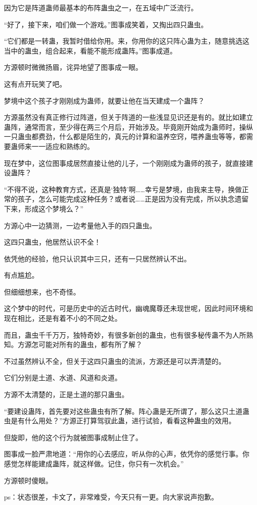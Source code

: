 \begin{this_body}
因为它是阵道蛊师最基本的布阵蛊虫之一，在五域中广泛流行。

“好了，接下来，咱们做一个游戏。”图事成笑着，又掏出四只蛊虫。

“它们都是一转蛊，我暂时借给你用。来，你用你的这只阵心蛊为主，随意挑选这当中的蛊虫，组合起来，看能不能形成蛊阵。”图事成道。

方源顿时微微扬眉，诧异地望了图事成一眼。

这有点开玩笑了吧。

梦境中这个孩子才刚刚成为蛊师，就要让他在当天建成一个蛊阵？

方源虽然没有真正修行过阵道，但关于阵道的一些浅显见识还是有的。就比如建立蛊阵，通常而言，至少得在两三个月后，开始涉及。毕竟刚开始成为蛊师时，操纵一只蛊虫都费劲，什么都是陌生的，真元的计算和温养空窍，喂养蛊虫等等，都需要蛊师来一一适应和熟练的。

现在梦中，这位图事成居然直接让他的儿子，一个刚刚成为蛊师的孩子，就直接建设蛊阵？

“不得不说，这种教育方式，还真是‘独特’啊……幸亏是梦境，由我来主导，换做正常的孩子，怎么可能完成这种任务？或者说……正是因为没有完成，所以执念遗留下来，形成这个梦境么？”

方源心中一边猜测，一边考量他入手的四只蛊虫。

这四只蛊虫，他居然认识不全！

依凭他的经验，他只认识其中三只，还有一只居然辨认不出。

有点尴尬。

但细细想来，也不奇怪。

这个梦中的时代，可是历史中的近古时代，幽魂魔尊还未现世呢，因此时间环境和现在相比，还是有着不小的不同之处。

而且，蛊虫千千万万，独特奇妙，有很多新创的蛊虫，也有很多秘传蛊不为人所熟知。方源怎可能对所有的蛊虫，都有所了解？

不过虽然辨认不全，但关于这四只蛊虫的流派，方源还是可以弄清楚的。

它们分别是土道、水道、风道和炎道。

方源不太清楚的，正是土道的那只蛊虫。

“要建设蛊阵，首先要对这些蛊虫有所了解。阵心蛊是无所谓了，那么这只土道蛊虫是有什么用处？”方源正打算驾驭此蛊，进行试验，看看这种蛊虫的效用。

但旋即，他的这个行为就被图事成制止住了。

图事成一脸严肃地道：“用你的心去感应，听从你的心声，依凭你的感觉行事。你感觉怎样能建成蛊阵，就这样做。记住，你只有一次机会。”

方源顿时傻眼。

ps：状态很差，卡文了，非常难受，今天只有一更。向大家说声抱歉。

\end{this_body}

